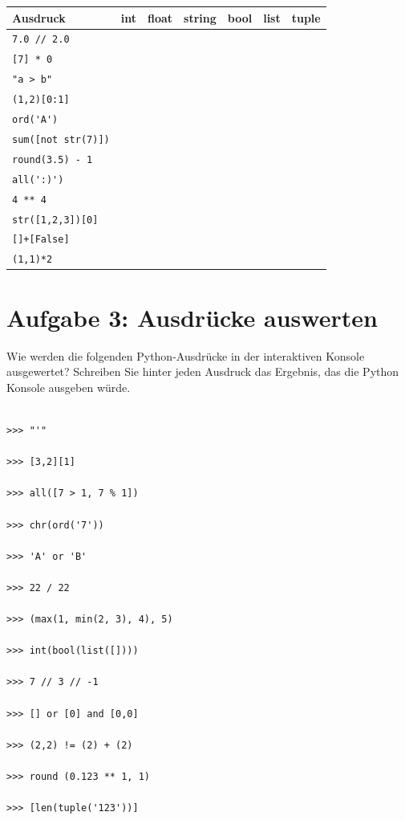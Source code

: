 \documentclass[ngerman,11pt]{article}
\begin{document}
\begin{center}
\begin{tabular}{|l|>{\centering}p{1.1cm}|>{\centering}p{1.1cm}|>{\centering}p{1.1cm}|>{\centering}p{1.1cm}|>{\centering}p{1.1cm}|>{\centering\arraybackslash}p{1.1cm}|}
\hline
\textbf{Ausdruck} & \textbf{int} & \textbf{float} & \textbf{string} & \textbf{bool} & \textbf{list} & \textbf{tuple} \\
\hline
\lstinline[style=inline]|7.0 // 2.0| & & & & & & \\[0.3cm]
\hline
\lstinline[style=inline]|[7] * 0| & & & & & & \\[0.3cm]
\hline
\lstinline[style=inline]|"a > b"| & & & & & & \\[0.3cm]
\hline
\lstinline[style=inline]|(1,2)[0:1]| & & & & & & \\[0.3cm]
\hline
\lstinline[style=inline]|ord('A')| & & & & & & \\[0.3cm]
\hline
\lstinline[style=inline]|sum([not str(7)])| & & & & & & \\[0.3cm]
\hline
\lstinline[style=inline]|round(3.5) - 1| & & & & & & \\[0.3cm]
\hline
\lstinline[style=inline]|all(':)')| & & & & & & \\[0.3cm]
\hline
\lstinline[style=inline]|4 ** 4| & & & & & & \\[0.3cm]
\hline
\lstinline[style=inline]|str([1,2,3])[0]| & & & & & & \\[0.3cm]
\hline
\lstinline[style=inline]|[]+[False]| & & & & & & \\[0.3cm]
\hline
\lstinline[style=inline]|(1,1)*2| & & & & & & \\[0.3cm]
\hline
\end{tabular}
\end{center}

\section*{Aufgabe 3: Ausdrücke auswerten}
Wie werden die folgenden Python-Ausdrücke in der interaktiven Konsole ausgewertet? Schreiben Sie hinter jeden Ausdruck das Ergebnis, das die Python Konsole ausgeben würde.

\begin{lstlisting}

>>> "'"

>>> [3,2][1]

>>> all([7 > 1, 7 % 1])

>>> chr(ord('7'))

>>> 'A' or 'B'

>>> 22 / 22

>>> (max(1, min(2, 3), 4), 5)

>>> int(bool(list([])))

>>> 7 // 3 // -1

>>> [] or [0] and [0,0]

>>> (2,2) != (2) + (2)

>>> round (0.123 ** 1, 1)

>>> [len(tuple('123'))]

\end{lstlisting}
\end{document}
